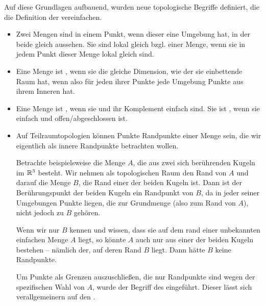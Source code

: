     Auf diese Grundlagen aufbauend, wurden neue topologische Begriffe definiert, die die Definition der \strukt vereinfachen.
    \begin{itemize}
        \item 
            Zwei Mengen sind  in einem Punkt, wenn dieser eine Umgebung hat, in der beide gleich aussehen.
            Sie sind lokal gleich bzgl. einer Menge, wenn sie in jedem Punkt dieser Menge lokal gleich sind.
        
        \item
            Eine Menge ist , wenn sie die gleiche Dimension, wie der sie einbettende Raum hat, wenn also für jeden ihrer Punkte jede Umgebung Punkte aus ihrem Inneren hat.
        
        \item
            Eine Menge ist , wenn sie und ihr Komplement einfach sind.
            Sie ist , wenn sie einfach und offen/abgeschlossen ist.
        
        \item
            Auf Teilraumtopologien können Punkte Randpunkte einer Menge sein, die wir eigentlich als innere Randpunkte betrachten wollen.
            
            Betrachte beispielsweise die Menge $A$, die aus zwei sich berührenden Kugeln im $\mathbb{R}^3$ besteht.
            Wir nehmen als topologischen Raum den Rand von $A$ und darauf die Menge $B$, die Rand einer der beiden Kugeln ist. 
            Dann ist der Berührungspunkt der beiden Kugeln ein Randpunkt von $B$, da in jeder seiner Umgebungen Punkte liegen, die zur Grundmenge (also zum Rand von $A$), nicht jedoch zu $B$ gehören.
            
            Wenn wir nur $B$ kennen und wissen, dass sie auf dem rand einer unbekannten einfachen Menge $A$ liegt, so könnte $A$ auch nur aus einer der beiden Kugeln bestehen -- nämlich der, auf deren Rand $B$ liegt.
            Dann hätte $B$ keine Randpunkte.
            
            Um Punkte als Grenzen auszuschließen, die nur Randpunkte sind wegen der spezifischen Wahl von $A$,  wurde der Begriff des  eingeführt.
            Dieser lässt sich verallgemeinern auf den .
    \end{itemize}
%
%
